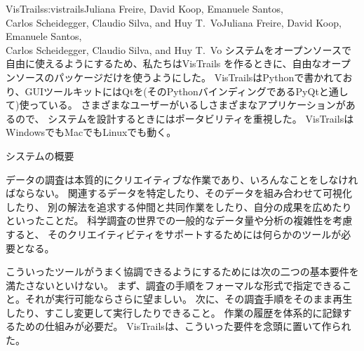 \begin{aosachaptertoc}{VisTrails}{s:vistrails}{Juliana Freire, David Koop, Emanuele Santos, \\ Carlos Scheidegger, Claudio Silva, and Huy T.\ Vo}{Juliana Freire, David Koop, Emanuele Santos, \\ \hspace*{0.9cm} Carlos Scheidegger, Claudio Silva, and Huy T.\ Vo}
システムをオープンソースで自由に使えるようにするため、私たちはVisTrails
を作るときに、自由なオープンソースのパッケージだけを使うようにした。
VisTrailsはPythonで書かれており、GUIツールキットにはQtを(そのPythonバインディングであるPyQtと通して)使っている。
さまざまなユーザーがいるしさまざまなアプリケーションがあるので、
システムを設計するときにはポータビリティを重視した。
VisTrailsはWindowsでもMacでもLinuxでも動く。


\begin{aosasect1}{システムの概要}

データの調査は本質的にクリエイティブな作業であり、いろんなことをしなければならない。
関連するデータを特定したり、そのデータを組み合わせて可視化したり、
別の解法を追求する仲間と共同作業をしたり、自分の成果を広めたりといったことだ。
科学調査の世界での一般的なデータ量や分析の複雑性を考慮すると、
そのクリエイティビティをサポートするためには何らかのツールが必要となる。

こういったツールがうまく協調できるようにするためには次の二つの基本要件を満たさないといけない。
まず、調査の手順をフォーマルな形式で指定できること。それが実行可能ならさらに望ましい。
次に、その調査手順をそのまま再生したり、すこし変更して実行したりできること。
作業の履歴を体系的に記録するための仕組みが必要だ。
VisTrailsは、こういった要件を念頭に置いて作られた。


\end{aosasect1}
\end{aosachaptertoc}
